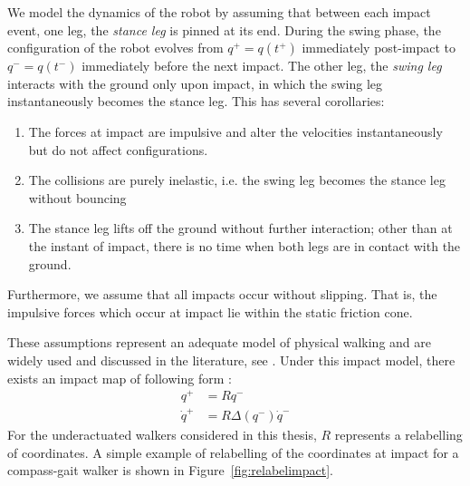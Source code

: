 We model the dynamics of the robot by assuming that between each impact event, one leg, the \textit{stance leg} is pinned at its end. During the swing phase, the configuration of the robot evolves from $q^+=q(t^+)$ immediately post-impact to $q^-=q(t^-)$ immediately before the next impact. The other leg, the \textit{swing leg} interacts with the ground only upon impact, in which the swing leg instantaneously becomes the stance leg. This has several corollaries:
\begin{enumerate}[parsep=0cm]
	\item The forces at impact are impulsive and alter the velocities instantaneously but do not affect configurations.
	\item The collisions are purely inelastic, i.e. the swing leg becomes the stance leg without bouncing
	\item The stance leg lifts off the ground without further interaction; other than at the instant of impact, there is no time when both legs are in contact with the ground.
\end{enumerate}
Furthermore, we assume that all impacts occur without slipping. That is, the impulsive forces which occur at impact lie within the static friction cone. 

These assumptions represent an adequate model of physical walking and are widely used and discussed in the literature, see \cite{hurmuzlu1994rigid, westervelt2007feedback}. Under this impact model, there exists an impact map of following form \cite{manchester13planning}:
\begin{subequations} \label{eqn:impact}
\begin{align}
	q^+ &= Rq^- \label{eqn:impactconfig}\\
	\dot{q}^+ &= R\Delta\left(q^-\right)\dot{q}^- \label{eqn:impactvel}
\end{align}
\end{subequations} %
For the underactuated walkers considered in this thesis, $R$ represents a relabelling of coordinates. A simple example of relabelling of the coordinates at impact for a compass-gait walker is shown in Figure~\ref{fig:relabelimpact}.

